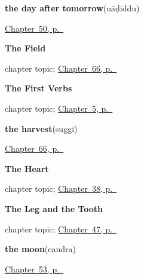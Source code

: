 \noindent\begin{minipage}[t]{\linewidth}
\raggedright
\textbf{the day after tomorrow}\enspace\emph{}\enspace(nāḍiddu)\par
\footnotesize \hyperref[ch:ka-leave-more]{Chapter~50, p.~\pageref*{ch:ka-leave-more}}
\end{minipage}\par\smallskip

\noindent\begin{minipage}[t]{\linewidth}
\raggedright
\textbf{The Field}\par
\footnotesize chapter topic; \hyperref[ch:ka-field]{Chapter~66, p.~\pageref*{ch:ka-field}}
\end{minipage}\par\smallskip

\noindent\begin{minipage}[t]{\linewidth}
\raggedright
\textbf{The First Verbs}\par
\footnotesize chapter topic; \hyperref[ch:first-verbs]{Chapter~5, p.~\pageref*{ch:first-verbs}}
\end{minipage}\par\smallskip

\noindent\begin{minipage}[t]{\linewidth}
\raggedright
\textbf{the harvest}\enspace\emph{}\enspace(suggi)\par
\footnotesize \hyperref[ch:ka-field]{Chapter~66, p.~\pageref*{ch:ka-field}}
\end{minipage}\par\smallskip

\noindent\begin{minipage}[t]{\linewidth}
\raggedright
\textbf{The Heart}\par
\footnotesize chapter topic; \hyperref[ch:ka-heart]{Chapter~38, p.~\pageref*{ch:ka-heart}}
\end{minipage}\par\smallskip

\noindent\begin{minipage}[t]{\linewidth}
\raggedright
\textbf{The Leg and the Tooth}\par
\footnotesize chapter topic; \hyperref[ch:ka-body-more]{Chapter~47, p.~\pageref*{ch:ka-body-more}}
\end{minipage}\par\smallskip

\noindent\begin{minipage}[t]{\linewidth}
\raggedright
\textbf{the moon}\enspace\emph{}\enspace(candra)\par
\footnotesize \hyperref[ch:ka-sky]{Chapter~53, p.~\pageref*{ch:ka-sky}}
\end{minipage}\par\smallskip

